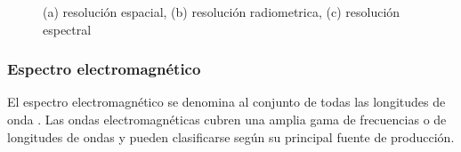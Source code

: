 \begin{figure}[htbp]
\centering
{}

\caption{(a) resolución espacial, (b) resolución radiometrica, (c) resolución espectral}\label{Fig:resoluciones}
\end{figure}


\subsubsection{Espectro electromagnético}

El espectro electromagnético se denomina al conjunto de todas las longitudes de onda \citep{chuvieco}. Las ondas electromagnéticas cubren una amplia gama de frecuencias o de longitudes de ondas y pueden clasificarse según su principal fuente de producción. 

